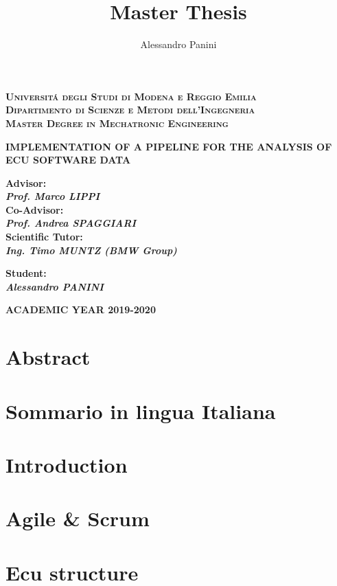 \documentclass[a4paper,12pt,twoside]{report}
\title{\textbf{Master Thesis}}
\date{}
\author{Alessandro Panini}
\newlength{\drop}%
\newcommand*{\titleSal}%
{
	\begin{center}  
		\begingroup
		{\large\bfseries\rmfamily\scshape Universit\'a degli Studi di Modena e Reggio Emilia}\\
		{\large\bfseries\rmfamily\scshape Dipartimento di Scienze e Metodi dell'Ingegneria }\\[\baselineskip]
		\vspace*{0.5cm}
		\vspace*{\drop}
		{\large\bfseries\rmfamily\scshape Master Degree in Mechatronic Engineering}\\[\baselineskip]
		\vspace*{\drop}
		
		\vspace*{3cm}
		
		\linespread{3}
        {\Large\bfseries\rmfamily IMPLEMENTATION OF A PIPELINE FOR THE ANALYSIS OF ECU SOFTWARE DATA}\\
		\vspace*{4cm}
		
	\end{center}
	\vspace*{1cm}   
	\begin{minipage}[t]{0.6\textwidth}
		\begin{flushleft}
			{\footnotesize\bfseries Advisor:}\\
			{\bfseries\small\itshape Prof. Marco LIPPI }\\
			{\footnotesize\bfseries Co-Advisor:}\\
			{\bfseries\small\itshape Prof. Andrea SPAGGIARI}\\
			{\footnotesize\bfseries Scientific Tutor:}\\
			{\bfseries\small\itshape Ing. Timo MUNTZ (BMW Group)}
		\end{flushleft}
	\end{minipage}
	\begin{minipage}[t]{0.3\textwidth}
		\begin{flushright} 
			{\bfseries\footnotesize Student:}\\
			{\bfseries\small\itshape Alessandro PANINI}
		\end{flushright}
	\end{minipage}  
	\vfill
	
	{\large\bfseries\rmfamily ACADEMIC YEAR 2019-2020}
	
	\endgroup
}
\begin{document}
	
\titleSal
\pagestyle{plain}

\newcommand*\rot{\multicolumn{1}{R{45}{1em}}}

	
	\newpage
	

\chapter*{}

\cleardoublepage

\tableofcontents
\cleardoublepage

 
\cleardoublepage

\chapter*{Abstract}


% 

\chapter{Sommario in lingua Italiana}

	
\chapter{Introduction}


\chapter{Agile \& Scrum}
	

\chapter{Ecu structure}
	
\end{document}
